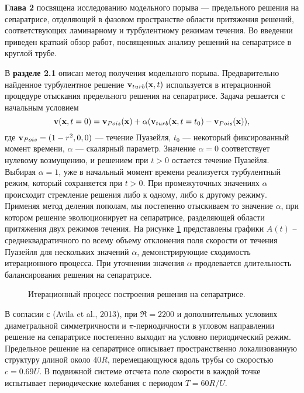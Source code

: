 \textbf{Глава 2} посвящена исследованию модельного порыва --- предельного решения на сепаратрисе, отделяющей в фазовом пространстве области притяжения решений, соответствующих ламинарному и турбулентному режимам течения. Во введении приведен краткий обзор работ, посвященных анализу решений на сепаратрисе в круглой трубе. 

В \textbf{разделе 2.1} описан метод получения модельного порыва. Предварительно найденное турбулентное решение $\mathbf{v}_{turb}(\mathbf{x},t)$ используется в итерационной процедуре отыскания предельного решения на сепаратрисе. Задача решается с начальным условием
\begin{equation} \label{edge_init_eq}
\mathbf{v}(\mathbf{x},t=0) = \mathbf{v}_{Pois}(\mathbf{x})+\alpha(\mathbf{v}_{turb}(\mathbf{x},t=t_0) - \mathbf{v}_{Pois}(\mathbf{x})),
\end{equation}
где $\mathbf{v}_{Pois}=(1-r^2,0,0)$ --- течение Пуазейля, $t_0$ --- некоторый фиксированный момент времени, $\alpha$ --- скалярный параметр. Значение $\alpha=0$ соответствует нулевому возмущению, и решением при $t > 0$ остается течение Пуазейля. Выбирая $\alpha=1$, уже в начальный момент времени реализуется турбулентный режим, который сохраняется при $t > 0$. При промежуточных значениях $\alpha$ происходит стремление решения либо к одному, либо к другому режиму. Применяя метод деления пополам, мы постепенно отыскиваем то значение $\alpha$, при котором решение эволюционирует на сепаратрисе, разделяющей области притяжения двух режимов течения. На рисунке \ref{bisection_pic} представлены графики $A(t)$ – среднеквадратичного по всему объему отклонения поля скорости от течения Пуазейля для нескольких значений $\alpha$, демонстрирующие сходимость итерационного процесса. При уточнении значения $\alpha$ продлевается длительность балансирования решения на сепаратрисе.

\begin{figure}
\caption{Итерационный процесс построения решения на сепаратрисе.}
\label{bisection_pic}
\end{figure}

В согласии с (Avila et al., 2013), при $\Re=2200$ и дополнительных условиях диаметральной симметричности и $\pi$-периодичности в угловом направлении решение на сепаратрисе постепенно выходит на условно периодический режим. Предельное решение на сепаратрисе описывает пространственно локализованную структуру длиной около $40R$, перемещающуюся вдоль трубы со скоростью $c=0.69U$. В подвижной системе отсчета поле скорости в каждой точке испытывает периодические колебания с периодом $T=60R/U$. 

